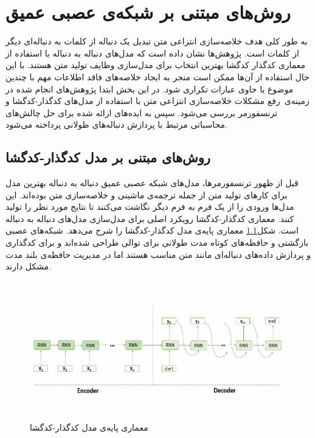 \chapter{روش‌های مبتنی بر شبکه‌ی عصبی عمیق}

 به طور کلی هدف خلاصه‌سازی انتزاعی متن تبدیل یک دنباله از کلمات به دنباله‌ای دیگر از کلمات است. پژوهش‌ها نشان داده است که مدل‌‌های دنباله به دنباله 
 با استفاده از معماری کدگذار کدگشا
  بهترین انتخاب برای مدل‌سازی وظایف تولید متن هستند. با این حال استفاده از آن‌ها ممکن است منجر به ایجاد خلاصه‌های فاقد اطلاعات مهم با چندین موضوع یا حاوی عبارات تکراری شود. در این بخش ابتدا  پژوهش‌های انجام شده در زمینه‌ی رفع مشکلات خلاصه‌سازی انتزاعی متن با استفاده از مدل‌های کدگذار-کدگشا و ترنسفورمر
  بررسی می‌شود.
   سپس به ایده‌های ارائه شده برای حل چالش‌های محاسباتی مرتبط با پردازش دنباله‌های طولانی پرداخته ‌می‌شود. 

% 


\section{روش‌های مبتنی بر مدل کدگذار-کدگشا}
قبل از ظهور ترنسفورمرها، مدل‌های شبکه عصبی عمیق دنباله به دنباله 
بهترین مدل برای کار‌های تولید متن از جمله ترجمه‌ی ماشینی و خلاصه‌سازی متن بوده‌اند. این مدل‌ها ورودی را از یک فرم به فرم دیگر نگاشت می‌کنند تا نتایج مورد نظر را تولید کنند. معماری کدگذار-کدگشا رویکرد اصلی برای مدل‌سازی مدل‌های دنباله به دنباله است. شکل\ref{fig:encoder_decoder} معماری پایه‌‌ی مدل کدگذار-کدگشا را شرح می‌دهد.
شبکه‌های عصبی بازگشتی
\cite{elman1990finding}
و حافظه‌های کوتاه مدت طولانی
\cite{hochreiter1997long}
برای توالی طراحی شده‌اند و برای کدگذاری و پردازش داده‌های دنباله‌ای مانند متن مناسب هستند اما در مدیریت حافظه‌ی بلند مدت
مشکل دارند.
\begin{figure}[!h]
	\begin{center}
		\includegraphics[height=6cm]{encoder_decoder.png}
	\end{center}
	\caption{معماری پایه‌‌ی مدل کدگذار-کدگشا\cite{ALOMARI}}
	\label{fig:encoder_decoder}
	\medskip
	\small
\end{figure}

